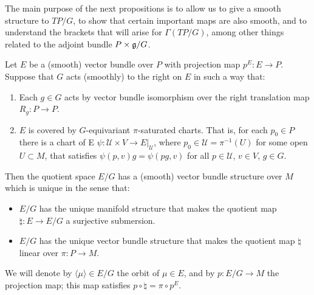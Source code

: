 

The main purpose of the next propositions is to allow us to give a smooth structure to $TP/G$, to show that certain important maps are also smooth, and to understand the brackets that will arise for $\Gamma(TP/G)$, among other things related to the adjoint bundle $P\times \mathfrak{g}/G$.

\begin{proposition}
Let $E$ be a (smooth) vector bundle over $P$ with projection map $p^E: E \to P$. Suppose that $G$ acts (smoothly) to the right on $E$ in such a way that:

\begin{enumerate}
    \item Each $g \in G$ acts by vector bundle isomorphism over the right translation map $R_g: P \to P$.
    
    \item $E$ is covered by $G$-equivariant $\pi$-saturated charts. That is, for each $p_0 \in P$ there is a chart of E $\psi: \mathcal U \times V \to E|_{\mathcal U}$, where $p_0 \in \mathcal U = \pi^{-1}(U)$ for some open $U \subset M$, that satisfies $\psi(p, v)g = \psi(pg, v)$ for all $p \in \mathcal U$, $v \in V$, $g \in G$.
\end{enumerate}

Then the quotient space $E/G$ has a (smooth) vector bundle structure over $M$ which is unique in the sense that:

\begin{itemize}
    \item $E/G$ has the unique manifold structure that makes the quotient map $\natural: E \to E/G$ a surjective submersion.
    \item $E/G$ has the unique vector bundle structure that makes the quotient map $\natural$ linear over $\pi: P \to M$.
\end{itemize}

We will denote by $\langle \mu \rangle \in E/G$ the orbit of $\mu \in E$, and by $p:E/G \to M$ the projection map; this map satisfies $p \circ \natural = \pi \circ p^E$.

\end{proposition}

